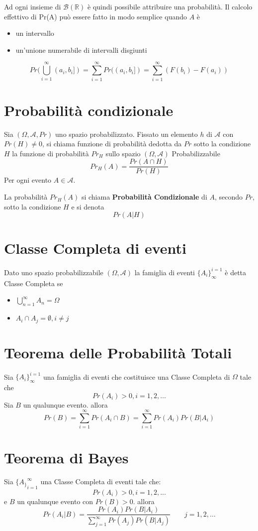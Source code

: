 \documentclass[a4paper]{report}
\begin{document}
  Ad ogni insieme di $\mathcal{B}(\mathbb{R})$ è quindi possibile attribuire una probabilità. Il calcolo effettivo di Pr(A) può essere fatto in modo semplice quando $A$ è
  \begin{itemize}
    \item un intervallo
    \item un'unione numerabile di intervalli disgiunti
  \end{itemize}
  \[ Pr(\bigcup\limits_{i=1}^{\infty} (a_i,b_i]) = \sum_{i=1}^{\infty} Pr((a_i,b_i]) = \sum_{i=1}^{\infty} (F(b_i)-F(a_i)) \]

  \section{Probabilità condizionale}
  Sia $(\Omega, \mathcal{A}, Pr)$ uno spazio probabilizzato. Fissato un elemento $h$ di $\mathcal{A}$ con $Pr(H) \neq 0$, si chiama funzione di probabilità dedotta da $Pr$ sotto la condizione $H$ la funzione di probabilità $Pr_H$ sullo spazio $(\Omega, \mathcal{A})$ Probabilizzabile
  \[ Pr_H(A) = \frac{Pr(A \cap H)}{Pr(H)} \]
  Per ogni evento $A \in \mathcal{A}$.

  La probabilità $Pr_H(A)$ si chiama \textbf{Probabilità Condizionale} di $A$, secondo $Pr$, sotto la condizione $H$ e si denota
  \[ Pr(A|H) \]

  \section{Classe Completa di eventi}
  Dato uno spazio probabilizzabile $(\Omega, \mathcal{A})$ la famiglia di eventi ${\{A_i\}_\infty^{i=1}}$ è detta Classe Completa se
  \begin{itemize}
    \item $\bigcup\limits_{n=1}^{\infty} A_n = \Omega$
    \item $A_i \cap A_j = \emptyset,  i \neq j$
  \end{itemize}

  \section{Teorema delle Probabilità Totali}
  Sia ${\{A_i\}_\infty^{i=1}}$ una famiglia di eventi che costituisce una Classe Completa di $\Omega$ tale che
  \[ Pr(A_i) > 0, i = 1,2,\dots \]
  Sia $B$ un qualunque evento. allora
  \[ Pr(B) = \sum_{i=1}^\infty Pr(A_i \cap B) = \sum_{i=1}^\infty Pr(A_i)Pr(B|A_i) \]

  \section{Teorema di Bayes}
  Sia ${\{A_\}}_{i=1}^\infty$ una Classe Completa di eventi tale che:\\
  $$Pr(A_i) > 0, i = 1,2,\dots$$
  e $B$ un qualunque evento con $Pr(B)>0$. allora
  $$Pr(A_i|B)=\frac{Pr(A_i)Pr(B|A_i)}{\sum_{j=1}^\infty Pr(A_j)Pr(B|A_j)} \qquad j=1,2,\dots  $$
\end{document}
